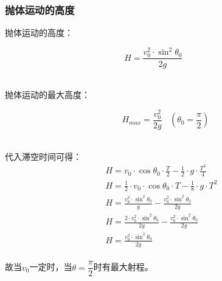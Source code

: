 \documentclass[UTF8]{ctexart}
\begin{document}
\newpage

\subsubsection{抛体运动的高度}
    \setcounter{equation}{0}
    抛体运动的高度：
    \begin{large}
        \begin{equation*}
            H=\frac{v_0^2\cdot\sin^2{\theta_0}}{2g}~~~~~
        \end{equation*}
    \end{large}\\
    抛体运动的最大高度：
    \begin{large}
        \begin{equation*}
            ~~~~~~~~H_{max}=\frac{v_0^2}{2g}~~~~\left(\theta_0=\frac{\pi}{2}\right)
        \end{equation*}
    \end{large}\\
    代入滞空时间可得：
    \begin{align}
        &H=v_0\cdot\cos{\theta_0}\cdot\frac{T}{2}-\frac{1}{2}\cdot g\cdot \frac{T^2}{4}\\[4mm]
        &H=\frac{1}{2}\cdot v_0\cdot\cos{\theta_0}\cdot T-\frac{1}{8}\cdot g\cdot T^2\\[4mm]
        &H=\frac{v_0^2\cdot\sin^2{\theta_0}}{g}-\frac{v_0^2\cdot\sin^2{\theta_0}}{2g}\\[4mm]
        &H=\frac{2\cdot v_0^2\cdot\sin^2{\theta_0}}{2g}-\frac{v_0^2\cdot\sin^2{\theta_0}}{2g}\\[4mm]
        &H=\frac{v_0^2\cdot\sin^2{\theta_0}}{2g}
    \end{align}\\
    故当$v_0$一定时，当$\theta=\dfrac{\pi}{2}$时有最大射程。

\newpage
\end{document}
